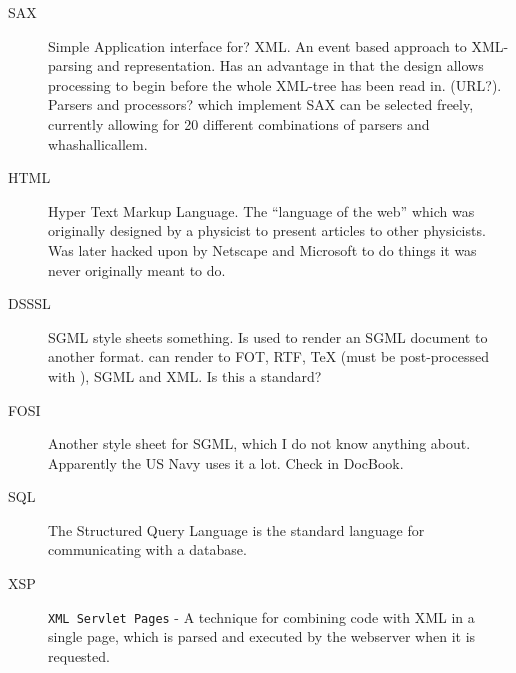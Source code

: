 \begin{description}
\item[SAX] Simple Application \textsf{interface for?} XML.  An event
  based approach to XML-parsing and representation.  Has an advantage
  in that the design allows processing to begin before the whole
  XML-tree has been read in.  (\textsf{URL?}).  Parsers and
  \textsf{processors?} which implement SAX can be selected freely,
  currently allowing for \textsf{20 different combinations of parsers
    and whashallicallem}.


\item[HTML] Hyper Text Markup Language.  The ``language of the web''
  which was originally designed by a physicist to present articles to
  other physicists.  Was later hacked upon by Netscape and Microsoft
  to do things it was never originally meant to do.

  
\item[DSSSL] \textsf{SGML style sheets something}.  Is used to render
  an SGML document to another format.   can render
  to \textsf{FOT}, RTF, {\TeX} (must be post-processed with
  ), SGML and XML.  \textsf{Is this a standard?}
  
\item[FOSI]  \textsf{Another style sheet for SGML}, which I do
  not know anything about.  Apparently the US Navy uses it a lot.
  Check in DocBook.

  
\item[SQL] The Structured Query Language is the \textsf{standard}
  language for communicating with a database.

  
\item[XSP] \texttt{XML Servlet Pages} - A technique for combining code
  with XML in a single page, which is parsed and executed by the
  webserver when it is requested.

\end{description}


    
